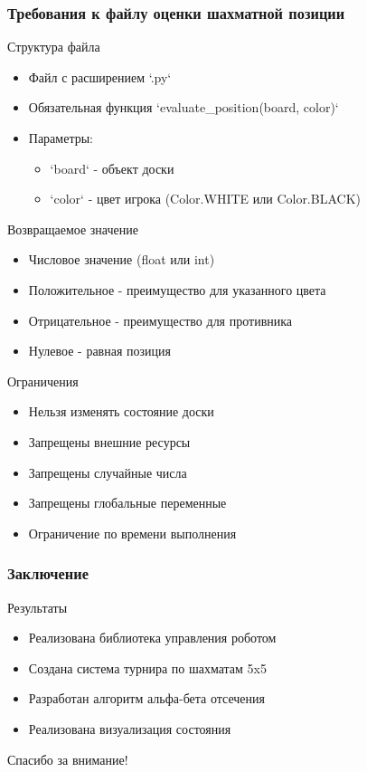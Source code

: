 \documentclass[14pt]{beamer}
\begin{document}
\begin{frame}
\frametitle{Требования к файлу оценки шахматной позиции}
\begin{block}{Структура файла}
\begin{itemize}
\item Файл с расширением `.py`
\item Обязательная функция `evaluate_position(board, color)`
\item Параметры:
  \begin{itemize}
  \item `board` - объект доски
  \item `color` - цвет игрока (Color.WHITE или Color.BLACK)
  \end{itemize}
\end{itemize}
\end{block}

\begin{block}{Возвращаемое значение}
\begin{itemize}
\item Числовое значение (float или int)
\item Положительное - преимущество для указанного цвета
\item Отрицательное - преимущество для противника
\item Нулевое - равная позиция
\end{itemize}
\end{block}

\begin{alertblock}{Ограничения}
\begin{itemize}
\item Нельзя изменять состояние доски
\item Запрещены внешние ресурсы
\item Запрещены случайные числа
\item Запрещены глобальные переменные
\item Ограничение по времени выполнения
\end{itemize}
\end{alertblock}
\end{frame}

\begin{frame}
\frametitle{Заключение}
\begin{block}{Результаты}
\begin{itemize}
\item Реализована библиотека управления роботом
\item Создана система турнира по шахматам 5x5
\item Разработан алгоритм альфа-бета отсечения
\item Реализована визуализация состояния
\end{itemize}
\end{block}
\end{frame}

\begin{frame}
\begin{center}
\Huge Спасибо за внимание!
\end{center}
\end{frame}
\end{document}
